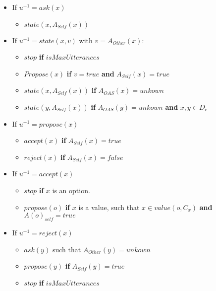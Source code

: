 \documentclass{llncs}
\begin{document}
\begin{itemize}
	\item If $u ^{-1}=ask (x)$
	\begin{itemize}
		\item $state(x, A_{Self}(x))$
		\\
	\end{itemize}	
	\item If $u ^{-1}=state (x, v)$ with $v = A_{Other}(x) $:
	\begin{itemize}
		\item $stop$ \textbf{if} $isMaxUtterances$
		\item $Propose (x)$ \textbf{ if } $ v = true$ \textbf{ and }
		$ A_{Self}(x) = true$
		\item $state(x,A_{Self}(x))$ \textbf{ if } $A_{OAS}(x)= unkown$
		\item $state(y,A_{Self}(x))$ \textbf{ if } $A_{OAS}(y)= unkown$ \textbf{ and } $x, y \in D_c$
		\\
	\end{itemize}
	
	\item If $u ^{-1}=propose(x)$
	\begin{itemize}
		\item $accept(x)$ \textbf{ if } $A_{Self}(x) = true$
		\item $reject(x)$ \textbf{ if } $A_{Self}(x) = false$
		\\
	\end{itemize}
	
	\item If $u ^{-1}=accept(x)$
	\begin{itemize}
		\item $stop$ \textbf{ if } $x$ is an option.
		\item $propose(o)$ \textbf{ if } $ x$  is a value, such that $x \in value(o, C_x)$ \textbf{ and } $A(o)_{self} = true$
		\\	
	\end{itemize}
	
	\item If $u ^{-1}=reject(x)$
	\begin{itemize}
		\item $ask(y)$ such that $A_{Other}(y)=unkown$
		\item $propose(y)$ \textbf{ if } $A_{Self}(y) = true$
		\item $stop$ \textbf{if} $isMaxUtterances$
		\\	
	\end{itemize}
	
\end{itemize}
\end{document}
